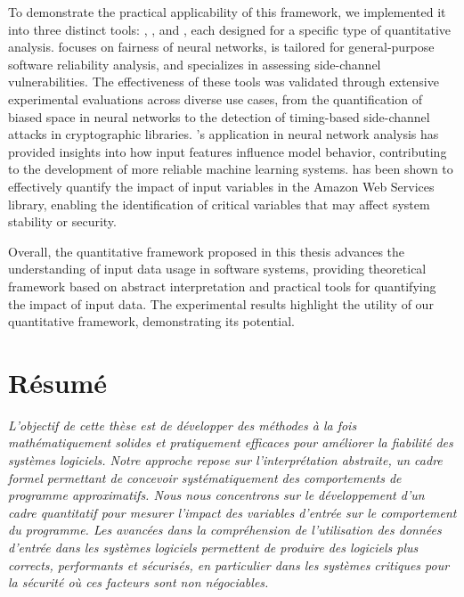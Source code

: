 To demonstrate the practical applicability of this framework, we implemented it into three distinct tools: \libra, \impatto, and \timesec, each designed for a specific type of quantitative analysis. \libra{} focuses on fairness of neural networks, \impatto{} is tailored for general-purpose software reliability analysis, and \timesec{} specializes in assessing side-channel vulnerabilities. The effectiveness of these tools was validated through extensive experimental evaluations across diverse use cases, from the quantification of biased space in neural networks to the detection of timing-based side-channel attacks in cryptographic libraries.
\libra's application in neural network analysis has provided insights into how input features influence model behavior, contributing to the development of more reliable machine learning systems.
\timesec{} has been shown to effectively quantify the impact of input variables in the Amazon Web Services \bignum{} library, enabling the identification of critical variables that may affect system stability or security.

Overall, the quantitative framework proposed in this thesis advances the understanding of input data usage in software systems, providing theoretical framework based on abstract interpretation and practical tools for quantifying the impact of input data. The experimental results highlight the utility of our quantitative framework, demonstrating its potential.


\chapter*{Résumé}

\emph{L'objectif de cette thèse est de développer des méthodes à la fois mathématiquement solides et pratiquement efficaces pour améliorer la fiabilité des systèmes logiciels. Notre approche repose sur l'interprétation abstraite, un cadre formel permettant de concevoir systématiquement des comportements de programme approximatifs. Nous nous concentrons sur le développement d'un cadre quantitatif pour mesurer l'impact des variables d'entrée sur le comportement du programme. Les avancées dans la compréhension de l'utilisation des données d'entrée dans les systèmes logiciels permettent de produire des logiciels plus corrects, performants et sécurisés, en particulier dans les systèmes critiques pour la sécurité où ces facteurs sont non négociables.}

